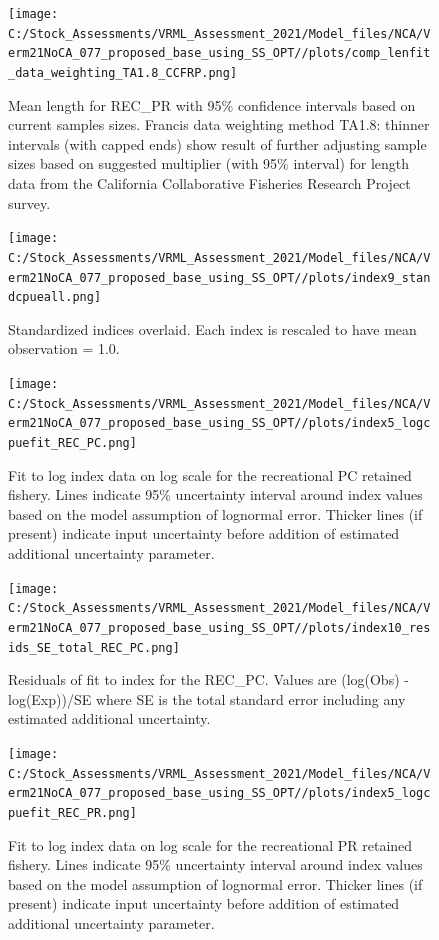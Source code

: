 \documentclass[
  english,
  a4paper,
]{article}
\begin{document}
\begin{figure}
\centering
\texttt{[image: C:/Stock\_Assessments/VRML\_Assessment\_2021/Model\_files/NCA/Verm21NoCA\_077\_proposed\_base\_using\_SS\_OPT//plots/comp\_lenfit\_data\_weighting\_TA1.8\_CCFRP.png]}
\caption{Mean length for REC\_PR with 95\% confidence intervals based on current samples sizes. Francis data weighting method TA1.8: thinner intervals (with capped ends) show result of further adjusting sample sizes based on suggested multiplier (with 95\% interval) for length data from the California Collaborative Fisheries Research Project survey.\label{fig:mean-len-fit-CCFRP}}
\end{figure}

\FloatBarrier

\FloatBarrier

\begin{figure}
\centering
\texttt{[image: C:/Stock\_Assessments/VRML\_Assessment\_2021/Model\_files/NCA/Verm21NoCA\_077\_proposed\_base\_using\_SS\_OPT//plots/index9\_standcpueall.png]}
\caption{Standardized indices overlaid. Each index is rescaled to have mean observation = 1.0.\label{fig:cpueall}}
\end{figure}

\begin{figure}
\centering
\texttt{[image: C:/Stock\_Assessments/VRML\_Assessment\_2021/Model\_files/NCA/Verm21NoCA\_077\_proposed\_base\_using\_SS\_OPT//plots/index5\_logcpuefit\_REC\_PC.png]}
\caption{Fit to log index data on log scale for the recreational PC retained fishery. Lines indicate 95\% uncertainty interval around index values based on the model assumption of lognormal error. Thicker lines (if present) indicate input uncertainty before addition of estimated additional uncertainty parameter.\label{fig:log-cpue-REC-PC}}
\end{figure}

\begin{figure}
\centering
\texttt{[image: C:/Stock\_Assessments/VRML\_Assessment\_2021/Model\_files/NCA/Verm21NoCA\_077\_proposed\_base\_using\_SS\_OPT//plots/index10\_resids\_SE\_total\_REC\_PC.png]}
\caption{Residuals of fit to index for the REC\_PC. Values are (log(Obs) - log(Exp))/SE where SE is the total standard error including any estimated additional uncertainty.\label{fig:cpue-resid-REC-PC}}
\end{figure}

\begin{figure}
\centering
\texttt{[image: C:/Stock\_Assessments/VRML\_Assessment\_2021/Model\_files/NCA/Verm21NoCA\_077\_proposed\_base\_using\_SS\_OPT//plots/index5\_logcpuefit\_REC\_PR.png]}
\caption{Fit to log index data on log scale for the recreational PR retained fishery. Lines indicate 95\% uncertainty interval around index values based on the model assumption of lognormal error. Thicker lines (if present) indicate input uncertainty before addition of estimated additional uncertainty parameter.\label{fig:log-cpue-REC-PR}}
\end{figure}
\end{document}
